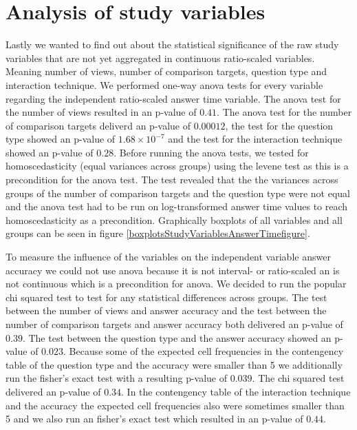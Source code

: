 \section{Analysis of study variables}
Lastly we wanted to find out about the statistical significance of the raw study variables that are not yet aggregated in continuous ratio-scaled
variables. Meaning number of views, number of comparison targets, question type and interaction technique. We performed
one-way anova tests for every variable regarding the independent ratio-scaled answer time variable. 
The anova test for the number of views resulted in an p-value of $0.41$.
The anova test for the number of comparison targets deliverd an p-value of $0.00012$, the test for the question type showed an p-value of
$1.68 \times 10^{-7}$ and the test for the interaction technique showed an p-value of $0.28$. Before running the anova tests, we tested for
homoscedasticity (equal variances across groups) using the levene test as this is a precondition for the anova test. The test revealed that
the the variances across groups of the number of comparison targets and the question type were not equal and the anova test had to be run on
log-transformed answer time values to reach homoscedasticity as a precondition. Graphically boxplots of all variables and all groups can be
seen in figure \ref{boxplotsStudyVariablesAnswerTimefigure}.

To measure the influence of the variables on the independent variable answer accuracy we could not use anova because it is not interval- or
ratio-scaled an is not continuous which is a precondition for anova. We decided to run the popular chi squared test to test for any statistical differences
across groups. The test between the number of views and answer accuracy and the test between the number of comparison targets and answer accuracy both
delivered an p-value of $0.39$. The test between the question type and the answer accuracy showed an p-value of $0.023$. Because
some of the expected cell frequencies in the contengency table of the question type and the accuracy were smaller than 5 we additionally run the fisher's
exact test with a resulting p-value of $0.039$. The chi squared test delivered an p-value of $0.34$. In the contengency table of the interaction
technique and the accuracy the expected cell frequencies also were sometimes smaller than 5 and we also run an fisher's exact test which resulted in
an p-value of $0.44$.

